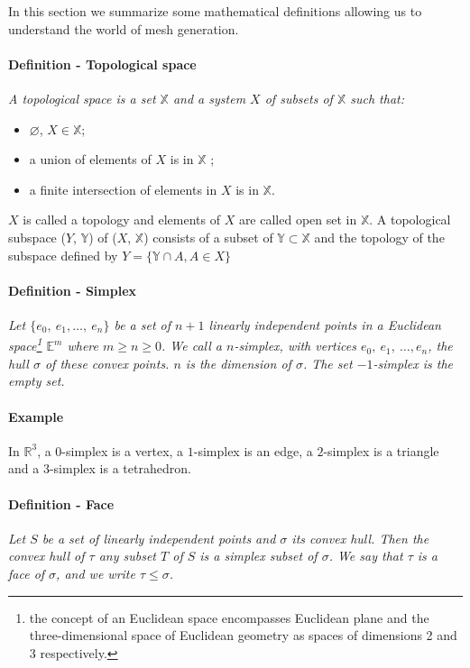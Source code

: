 In this section we summarize some mathematical definitions allowing us to understand the world of mesh generation.

\paragraph{Definition - Topological space}
{
\it A topological space is a set $\mathbb{X}$ and a system $X$ of subsets of $\mathbb{X}$ such that:
\begin{itemize}
\item  $\varnothing$, $X \in \mathbb{X}$;
\item  a union of elements of $X$ is in $\mathbb{X}$ ;
\item  a finite intersection of elements in $X$ is in $\mathbb{X}$.
\end{itemize}

$X$ is called a topology and elements of $X$ are called open set in $\mathbb{X}$. A topological subspace ($Y$, $\mathbb{Y}$) of ($X$, $\mathbb {X}$) consists of a subset of $\mathbb{Y} \subset \mathbb{X}$ and the topology of the subspace defined by $Y = \{\mathbb{Y} \cap A, A \in X \}$
}

\paragraph{Definition - Simplex}
{
\it Let $\{e_{0},~e_{1}, \dots,~ e_{n} \}$ be a set of $n+1$ linearly independent points in a Euclidean space\footnote{the concept of an Euclidean space encompasses Euclidean plane and the three-dimensional space of Euclidean geometry as spaces of dimensions 2 and 3 respectively.} $\mathbb{E}^{m}$ where $m \ge n \ge 0$. We call a $n$-simplex, with vertices $e_{0},~e_ {1},~\dots, e_{n}$, the hull $\sigma $ of these convex points. $n$ is the dimension of $\sigma$. The set $-1$-simplex is the empty set.
}

\paragraph{Example}
{
In $\mathbb{R}^{3}$, a $0$-simplex is a vertex, a $1$-simplex is an edge, a $2$-simplex is a triangle and a $3$-simplex is a tetrahedron.
}

\paragraph{Definition - Face}
{
\it Let $S$ be a set of linearly independent points and $\sigma$ its convex hull. Then the convex hull of $\tau$ any subset $T$ of $S$ is a simplex subset of $\sigma$. We say that $\tau$ is a face of $\sigma$, and we write $\tau \le \sigma$.
}


